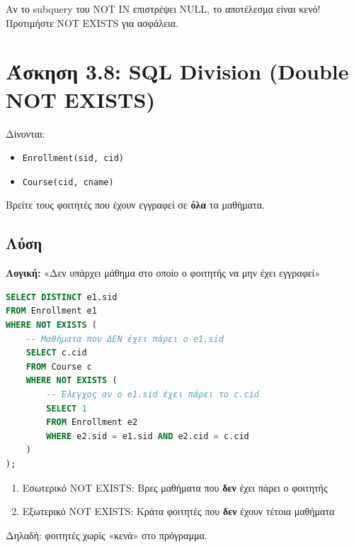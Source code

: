 \begin{warningbox}
Αν το subquery του NOT IN επιστρέψει NULL, το αποτέλεσμα είναι κενό!
Προτιμήστε NOT EXISTS για ασφάλεια.
\end{warningbox}

\section{Άσκηση 3.8: SQL Division (Double NOT EXISTS)}

\begin{formulabox}[Εκφώνηση]
Δίνονται:
\begin{itemize}
    \item \texttt{Enrollment(sid, cid)}
    \item \texttt{Course(cid, cname)}
\end{itemize}

Βρείτε τους φοιτητές που έχουν εγγραφεί σε \textbf{όλα} τα μαθήματα.
\end{formulabox}

\subsection*{Λύση}

\textbf{Λογική:} «Δεν υπάρχει μάθημα στο οποίο ο φοιτητής να μην έχει εγγραφεί»

\begin{lstlisting}[language=SQL]
SELECT DISTINCT e1.sid
FROM Enrollment e1
WHERE NOT EXISTS (
    -- Μαθήματα που ΔΕΝ έχει πάρει ο e1.sid
    SELECT c.cid
    FROM Course c
    WHERE NOT EXISTS (
        -- Έλεγχος αν ο e1.sid έχει πάρει το c.cid
        SELECT 1
        FROM Enrollment e2
        WHERE e2.sid = e1.sid AND e2.cid = c.cid
    )
);
\end{lstlisting}

\begin{infobox}
\begin{enumerate}
    \item Εσωτερικό NOT EXISTS: Βρες μαθήματα που \textbf{δεν} έχει πάρει ο φοιτητής
    \item Εξωτερικό NOT EXISTS: Κράτα φοιτητές που \textbf{δεν} έχουν τέτοια μαθήματα
\end{enumerate}
Δηλαδή: φοιτητές χωρίς «κενά» στο πρόγραμμα.
\end{infobox}

